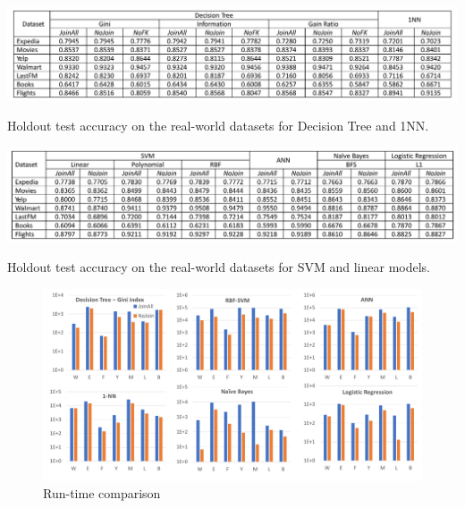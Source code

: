 \documentclass{vldb}
\begin{document}
\begin{table}[t]
\centering
\includegraphics[width=0.99\linewidth]{table2-1.pdf}
\caption{Holdout test accuracy on the real-world datasets for Decision Tree and 1NN.}
\label{Table:RealTest}
\end{table}

\begin{table}[t]
\centering
\includegraphics[width=0.99\linewidth]{table2-2.pdf}
\caption{Holdout test accuracy on the real-world datasets for SVM and linear models.}
\label{Table:RealTest}
\end{table}

\begin{figure}[t]
\centering
\includegraphics[width=\linewidth]{histogram.pdf}
\caption{Run-time comparison}
\label{Figure:runtime}
\end{figure}
\end{document}
